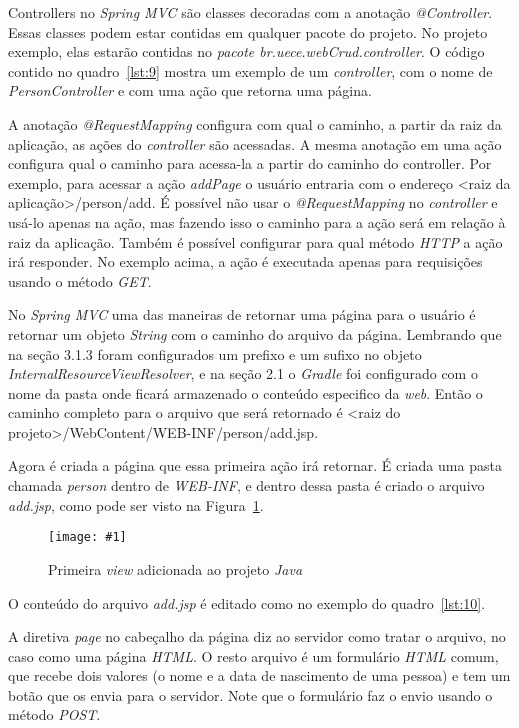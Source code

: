 \documentclass[a4paper,12pt]{article}
\newcommand{\figura}[3] {
	\begin{figure}[ht]
		\centering
		\texttt{[image: \#1]}
		\caption{#2}
		\label{#3}
	\end{figure}
	\FloatBarrier
}
\newcommand{\est}[1] {
\textit{#1}}
\newcommand{\classe}[1] {
\textit{#1}}
\newcommand{\arquivo}[1] {
\textit{#1}}
\newcommand{\sigla}[1] {
\textit{#1}}
\newcommand{\lang}[1] {
\textit{#1}}
\newcommand{\annotation}[1] {
\textit{#1}}
\newcommand{\pacote}[1] {
\textit{#1}}
\newcommand{\metodo}[1] {
\textit{#1}}
\newcommand{\javacode}[3] {
	
}
\newcommand{\jspcode}[3] {
	
}
\begin{document}
Controllers no \est{Spring MVC} são classes decoradas com a anotação \annotation{@Controller}. Essas classes podem estar contidas em qualquer pacote do projeto. No projeto exemplo, elas estarão contidas no \pacote{pacote br.uece.webCrud.controller}. O código contido no quadro~\ref{lst:9} mostra um exemplo de um \est{controller}, com o nome de \classe{PersonController} e com uma ação que retorna uma página.

\javacode{code/9.txt}{\classe{PersonController} no projeto \est{Spring}}{lst:9}

A anotação \annotation{@RequestMapping} configura com qual o caminho, a partir da raiz da aplicação, as ações do \est{controller} são acessadas. A mesma anotação em uma ação configura qual o caminho para acessa-la a partir do caminho do controller. Por exemplo, para acessar a ação \metodo{addPage} o usuário entraria com o endereço <raiz da aplicação>/person/add. É possível não usar o \annotation{@RequestMapping} no \est{controller} e usá-lo apenas na ação, mas fazendo isso o caminho para a ação será em relação à raiz da aplicação. Também é possível configurar para qual método \sigla{HTTP} a ação irá responder. No exemplo acima, a ação é executada apenas para requisições usando o método \est{GET}.

No \est{Spring MVC} uma das maneiras de retornar uma página para o usuário é retornar um objeto \est{String} com o caminho do arquivo da página. Lembrando que na seção 3.1.3 foram configurados um prefixo e um sufixo no objeto \classe{InternalResourceViewResolver}, e na seção 2.1 o \est{Gradle} foi configurado com o nome da pasta onde ficará armazenado o conteúdo especifico da \est{web}. Então o caminho completo para o arquivo que será retornado é <raiz do projeto>/WebContent/WEB-INF/person/add.jsp.

Agora é criada a página que essa primeira ação irá retornar. É criada uma pasta chamada \arquivo{person} dentro de \arquivo{WEB-INF}, e dentro dessa pasta é criado o arquivo \arquivo{add.jsp}, como pode ser visto na Figura~\ref{fig:24}.

\figura{24.png}{Primeira \est{view} adicionada ao projeto \lang{Java}}{fig:24}

O conteúdo do arquivo \arquivo{add.jsp} é editado como no exemplo do quadro~\ref{lst:10}.

\jspcode{code/10.txt}{Arquivo \arquivo{add.jsp}}{lst:10}

A diretiva \est{page} no cabeçalho da página diz ao servidor como tratar o arquivo, no caso como uma página \sigla{HTML}. O resto arquivo é um formulário \sigla{HTML} comum, que recebe dois valores (o nome e a data de nascimento de uma pessoa) e tem um botão que os envia para o servidor. Note que o formulário faz o envio usando o método \est{POST}.
\end{document}
